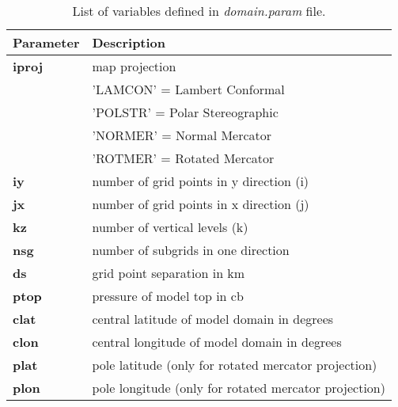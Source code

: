 \begin{table}[h]
\begin{center}
\caption{List of variables defined in {\it domain.param} file.}  \label{domain.param_file}
\vspace{0.25cm}
\begin{tabular}{|l|l|} \hline \hline
{\small {\bf Parameter}}   &   {\small {\bf Description}} \\ \hline \hline
{\footnotesize {\bf iproj}}    & {\footnotesize map projection} \\ 
 &  \vspace{-0.15 cm} \hspace{0.5 cm} {\footnotesize 'LAMCON' = Lambert Conformal } \\
 &  \vspace{-0.15 cm} \hspace{0.5 cm} {\footnotesize 'POLSTR' = Polar Stereographic } \\ 
 &  \vspace{-0.15 cm} \hspace{0.5 cm} {\footnotesize 'NORMER' = Normal Mercator} \\
 &  \hspace{0.5 cm} {\footnotesize 'ROTMER' = Rotated Mercator} \\ \hline
{\footnotesize {\bf iy}}   &   {\footnotesize number of grid points in y direction (i)} \\ \hline
{\footnotesize {\bf jx}}   &   {\footnotesize number of grid points in x direction (j)} \\ \hline
{\footnotesize {\bf kz}}   &   {\footnotesize number of vertical levels (k)} \\ \hline
{\footnotesize {\bf nsg}}  &   {\footnotesize number of subgrids in one direction} \\ \hline
{\footnotesize {\bf ds}}   &   {\footnotesize grid point separation in km} \\ \hline
{\footnotesize {\bf ptop}} &   {\footnotesize pressure of model top in cb} \\ \hline
{\footnotesize {\bf clat}} &   {\footnotesize central latitude of model domain in degrees} \\  \hline
{\footnotesize {\bf clon}} &   {\footnotesize central longitude of model domain in degrees} \\  \hline
{\footnotesize {\bf plat}} &   {\footnotesize pole latitude (only for rotated mercator projection)} \\  \hline
{\footnotesize {\bf plon}} &   {\footnotesize pole longitude (only for rotated mercator projection)} \\  \hline

\end{tabular}
\end{center}
\end{table}
